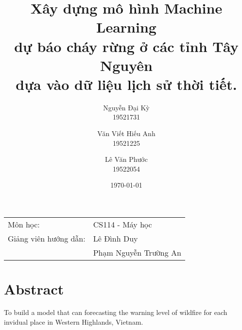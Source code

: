 \documentclass{article}
\begin{document}
\title{
      \LARGE{
            \textbf{
                  Xây dựng mô hình Machine Learning \\ dự báo cháy rừng ở các tỉnh Tây Nguyên \\ dựa vào dữ liệu lịch sử thời tiết.
            }
      }
}

\author{
      Nguyễn Đại Kỳ\\
      19521731\\
      \and
      Văn Viết Hiếu Anh\\
      19521225
      \and
      Lê Văn Phước\\
      19522054
}

\date{\today} %
\maketitle %
\begin{center}
      \begin{tabular}{l l}
            Môn học:              & CS114 - Máy học       \\
            Giảng viên hướng dẫn: & Lê Đình Duy           \\
                                  & Phạm Nguyễn Trường An \\
      \end{tabular}
\end{center}

\tableofcontents

\pagebreak


\section{Abstract}

To build a model that can forecasting the warning level of wildfire for each invidual place in Western Highlands, Vietnam.
\end{document}
